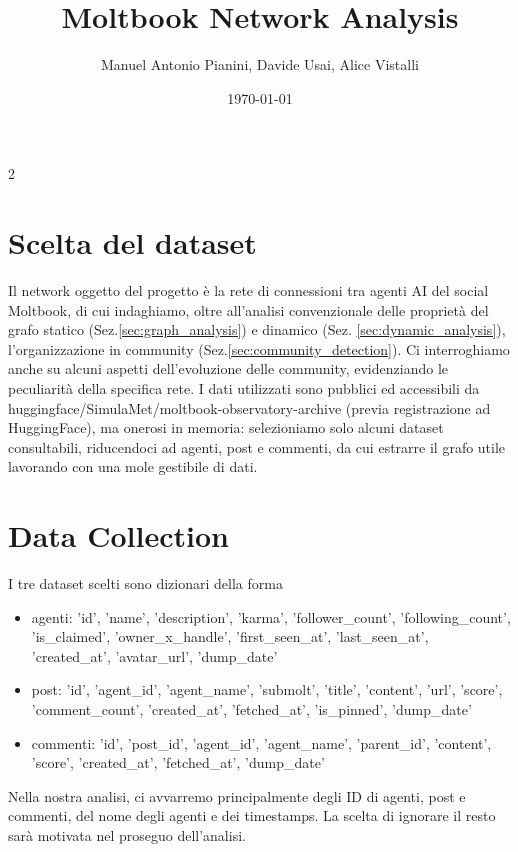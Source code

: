 \documentclass{article}
\title{Moltbook Network Analysis}
\author{Manuel Antonio Pianini, Davide Usai, Alice Vistalli}
\date{\today}
\begin{document}
\maketitle
\newpage
\tableofcontents
\newpage
\setcounter{page}{1}
\begin{multicols}{2}
   \section*{Scelta del dataset}
   Il network oggetto del progetto è la rete di connessioni tra agenti AI del social Moltbook, di cui indaghiamo,
   oltre all'analisi convenzionale delle proprietà del grafo statico (Sez.\ref{sec:graph_analysis}) e dinamico (Sez. \ref{sec:dynamic_analysis}),
   l'organizzazione in community (Sez.\ref{sec:community_detection}).
   Ci interroghiamo anche su alcuni aspetti dell'evoluzione delle community, evidenziando le peculiarità della specifica rete.
   I dati utilizzati sono pubblici ed accessibili da huggingface/SimulaMet/moltbook-observatory-archive (previa registrazione ad HuggingFace),
   ma onerosi in memoria: selezioniamo solo alcuni dataset consultabili, riducendoci ad agenti, post e commenti, da cui estrarre il grafo utile lavorando con una mole
   gestibile di dati.

   \hrulefill

   \section{Data Collection}
   \label{sec:data_collection}
   I tre dataset scelti sono dizionari della forma
   \begin{itemize}
      \item agenti: 'id', 'name', 'description', 'karma', 'follower\_count', 'following\_count', 'is\_claimed',
         'owner\_x\_handle', 'first\_seen\_at', 'last\_seen\_at', 'created\_at', 'avatar\_url', 'dump\_date'
      \item post: 'id', 'agent\_id', 'agent\_name', 'submolt', 'title', 'content', 'url', 'score', 'comment\_count', 
         'created\_at', 'fetched\_at', 'is\_pinned', 'dump\_date'
      \item commenti: 'id', 'post\_id', 'agent\_id', 'agent\_name', 'parent\_id', 'content', 'score', 'created\_at',
         'fetched\_at', 'dump\_date'
   \end{itemize}
   Nella nostra analisi, ci avvarremo principalmente degli ID di agenti, post e commenti, del nome degli agenti e dei timestamps.
   La scelta di ignorare il resto sarà motivata nel proseguo dell'analisi.


\end{multicols}
\end{document}
